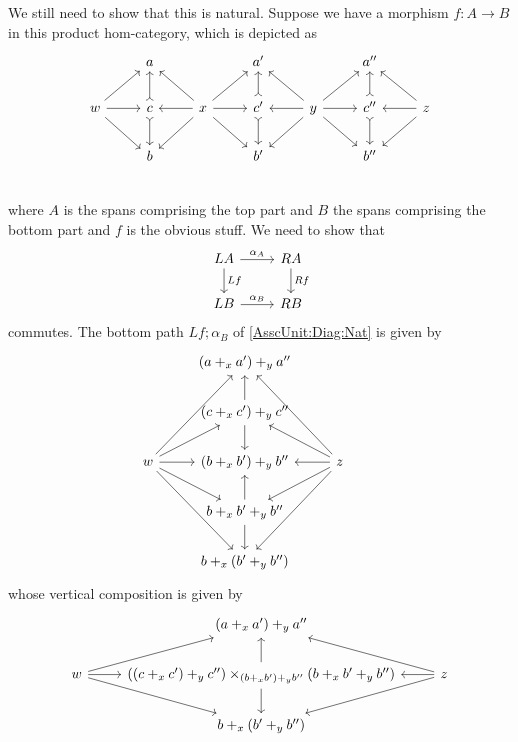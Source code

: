\documentclass[12pt]{article}
\newcommand{\from}{\colon}
\renewcommand{\(}{\left(}
\renewcommand{\)}{\right)}
\renewcommand{\{}{\left\lbrace}
\renewcommand{\}}{\right\rbrace}
\theoremstyle{remark}
\theoremstyle{definition}
\begin{document}
We still need to show that this is natural.  Suppose we have a morphism $f \from A \to B$ in this product hom-category, which is depicted as
\[
	\begin{tikzcd}
		{} & 
		{a} &
		{} &
		{a'} &
		{} &
		{a''} &
		{} \\
		{w} 
			\ar[ru] 
			\ar[r]
			\ar[rd] & 
		{c} 
			\ar[u, rightarrowtail]
			\ar[d, rightarrowtail] &
		{x} 
			\ar[lu]
			\ar[l]
			\ar[ld]
			\ar[ru]
			\ar[r]
			\ar[rd] &
		{c'} 
			\ar[u, rightarrowtail]
			\ar[d, rightarrowtail]&
		{y} 
			\ar[lu]
			\ar[l]
			\ar[ld]
			\ar[ru]
			\ar[r]
			\ar[rd] &
		{c''} 
			\ar[u, rightarrowtail]
			\ar[d, rightarrowtail]&
		{z} 
			\ar[lu]
			\ar[l]
			\ar[ld] \\
		{} & 
		{b} &
		{} &
		{b'} &
		{} &
		{b''} &
		{} \\
	\end{tikzcd}
\]
 where $A$ is the spans comprising the top part and $B$ the spans comprising the bottom part and $f$ is the obvious stuff.  We need to show that
 \begin{equation} \label{AsscUnit:Diag:Nat}
	 \begin{tikzcd} 
		 {LA} 
			 \ar[r, "\alpha_A"] 
			 \ar[d, "Lf"]&
		 {RA} 
			 \ar[d, "Rf"]\\
		 {LB} 
			 \ar[r, "\alpha_B"]&
		 {RB}
	 \end{tikzcd}
\end{equation}
commutes.  The bottom path $Lf;\alpha_B$ of \eqref{AsscUnit:Diag:Nat} is given by
\[
	\begin{tikzcd}
		{} &
		{(a +_x a') +_y a''} &
		{} \\
		{} &
		{(c +_x c') +_y c''} 
			\ar[u]
			\ar[d] &
		{} \\
		{w} 
			\ar[ruu] 
			\ar[ru]
			\ar[r]
			\ar[rd]
			\ar[rdd] &
		{(b +_x b') +_y b''} &
		{z} 
			\ar[luu] 
			\ar[lu]
			\ar[l]
			\ar[ld]
			\ar[ldd] &\\
		{} &
		{b +_x b' +_y b''} 
			\ar[u]
			\ar[d] &
		{} \\
		{} &
		{b +_x (b' +_y b'')} &
		{} 
	\end{tikzcd}
\]
whose vertical composition is given by
\[
	\begin{tikzcd}
		{} &
		{(a +_x a') +_y a''} &
		{} \\
		{w} 
			\ar[ru] 
			\ar[r]
			\ar[rd] &
		{((c+_xc')+_yc'') \times_{(b+_xb')+_yb''}(b+_xb'+_yb'') } 
			\ar[u]
			\ar[d]&
		{z} 
			\ar[lu] 
			\ar[l]
			\ar[ld] \\
		{} &
		{b +_x (b' +_y b'')} &
		{} 
	\end{tikzcd}
\]
\end{document}
